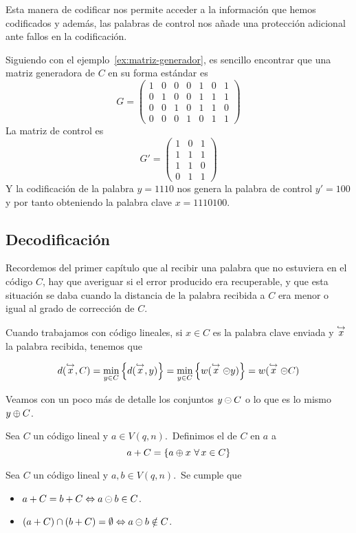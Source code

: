Esta manera de codificar nos permite acceder a la información que hemos codificados y además, las palabras de control nos añade una protección adicional ante fallos en la codificación.

\begin{example}
	Siguiendo con el ejemplo~\ref{ex:matriz-generador}, es sencillo encontrar que una matriz generadora de $C$ en su forma estándar es
	\[
		G=\begin{pmatrix*}
				1&0&0&0&1&0&1\\
				0&1&0&0&1&1&1\\
				0&0&1&0&1&1&0\\
				0&0&0&1&0&1&1
		\end{pmatrix*}
	\]
	La matriz de control es
	\[
		G'=\begin{pmatrix*}
			  1&0&1\\
			  1&1&1\\
			  1&1&0\\
			  0&1&1
		\end{pmatrix*}
	\]
	Y la codificación de la palabra $y=1110$ nos genera la palabra de control $y'=100$ y por tanto obteniendo la palabra clave $x=1110100$.
\end{example}

\subsection{Decodificación}
Recordemos del primer capítulo que al recibir una palabra que no estuviera en el código $C$, hay que averiguar si el error producido era recuperable, y que esta situación se daba cuando la distancia de la palabra recibida a $C$ era menor o igual al grado de corrección de $C$.

Cuando trabajamos con código lineales, si $x\in C$ es la palabra clave enviada y $\stackrel{\hookrightarrow}{x}$ la palabra recibida, tenemos que

\begin{equation}
	\label{eq:distancia-recibida-codigo-lineal}
	d(\stackrel{\hookrightarrow}{x}, C) = \min_{y\in C}\left\{d(\stackrel{\hookrightarrow}{x}, y)\right\}= \min_{y\in C}\left\{w(\stackrel{\hookrightarrow}{x}\circleddash y)\right\}=w(\stackrel{\hookrightarrow}{x}\circleddash C)
\end{equation}

Veamos con un poco más de detalle los conjuntos $y\circleddash C$ o lo que es lo mismo $y\oplus C$.
\begin{definition}
	Sea $C$ un código lineal y $a\in V(q, n)$.\ Definimos el  de $C$ en $a$ a
	\[
		a+C=\set{a\mas x\ \forall x\in C}
	\]
\end{definition}
\begin{lemma}
	Sea $C$ un código lineal y $a, b\in V(q, n)$.\ Se cumple que
	\begin{itemize}
		\item $a+C = b+C\Leftrightarrow a\circleddash b\in C$.
		\item $(a+C) \cap (b+C) = \emptyset \Leftrightarrow a\circleddash b\notin C$.
	\end{itemize}
\end{lemma}

